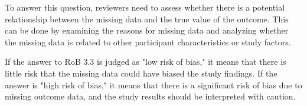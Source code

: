 \documentclass[sn-mathphys,Numbered]{sn-jnl}%
\begin{document}
To answer this question, reviewers need to assess whether there is a potential relationship between the missing data and the true value of the outcome. This can be done by examining the reasons for missing data and analyzing whether the missing data is related to other participant characteristics or study factors.

If the answer to RoB 3.3 is judged as "low risk of bias," it means that there is little risk that the missing data could have biased the study findings. If the answer is "high risk of bias," it means that there is a significant risk of bias due to missing outcome data, and the study results should be interpreted with caution.
%
%
%

\end{document}
